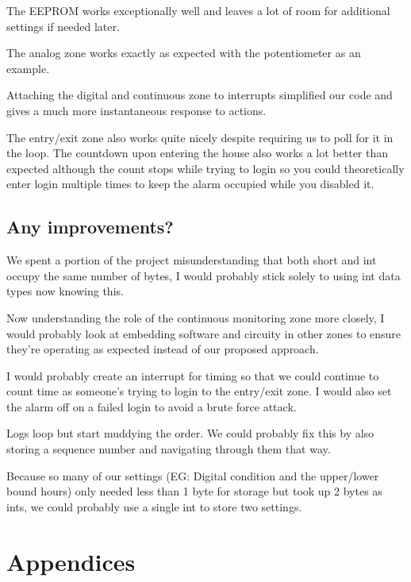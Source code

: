 \documentclass[a4paper,11pt]{article}
\theoremstyle{mytheor}
\begin{document}
The EEPROM works exceptionally well and leaves a lot of room for additional settings if needed later. 

The analog zone works exactly as expected with the potentiometer as an example.

Attaching the digital and continuous zone to interrupts simplified our code and gives a much more instantaneous response to actions.

The entry/exit zone also works quite nicely despite requiring us to poll for it in the loop. The countdown upon entering the house also works a lot better than expected although the count stops while trying to login so you could theoretically enter login multiple times to keep the alarm occupied while you disabled it.

\subsection{Any improvements?}
We spent a portion of the project misunderstanding that both short and int occupy the same number of bytes, I would probably stick solely to using int data types now knowing this.

Now understanding the role of the continuous monitoring zone more closely, I would probably look at embedding software and circuity in other zones to ensure they're operating as expected instead of our proposed approach.

I would probably create an interrupt for timing so that we could continue to count time as someone's trying to login to the entry/exit zone. I would also set the alarm off on a failed login to avoid a brute force attack.

Logs loop but start muddying the order. We could probably fix this by also storing a sequence number and navigating through them that way.

Because so many of our settings (EG: Digital condition and the upper/lower bound hours) only needed less than 1 byte for storage but took up 2 bytes as ints, we could probably use a single int to store two settings.
\section{Appendices}
\begin{lstlisting}

\end{lstlisting}
\end{document}
